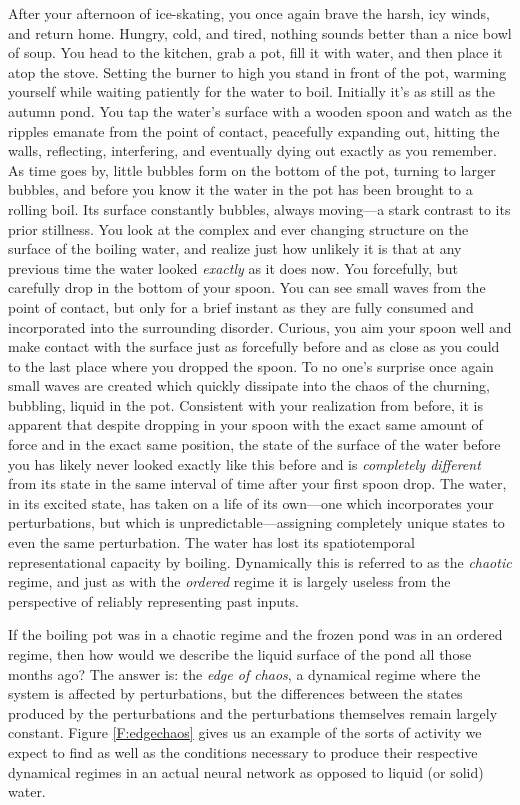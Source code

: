 After your afternoon of ice-skating, you once again brave the harsh, icy winds, and return home. Hungry, cold, and tired, nothing sounds better than a nice bowl of soup. You head to the kitchen, grab a pot, fill it with water, and then place it atop the stove. Setting the burner to high you stand in front of the pot, warming yourself while waiting patiently for the water to boil. Initially it's as still as the autumn pond. You tap the water's surface with a wooden spoon and watch as the ripples emanate from the point of contact, peacefully expanding out, hitting the walls, reflecting, interfering, and eventually dying out exactly as you remember. As time goes by, little bubbles form on the bottom of the pot, turning to larger bubbles, and before you know it the water in the pot has been brought to a rolling boil. Its surface constantly bubbles, always moving---a stark contrast to its prior stillness. You look at the complex and ever changing structure on the surface of the boiling water, and realize just how unlikely it is that at any previous time the water looked \emph{exactly} as it does now. You forcefully, but carefully drop in the bottom of your spoon. You can see small waves from the point of contact, but only for a brief instant as they are fully consumed and incorporated into the surrounding disorder. Curious, you aim your spoon well and make contact with the surface just as forcefully before and as close as you could to the last place where you dropped the spoon. To no one's surprise once again small waves are created which quickly dissipate into the chaos of the churning, bubbling, liquid in the pot. Consistent with your realization from before, it is apparent that despite dropping in your spoon with the exact same amount of force and in the exact same position, the state of the surface of the water before you has likely never looked exactly like this before and is \emph{completely different} from its state in the same interval of time after your first spoon drop. The water, in its excited state, has taken on a life of its own---one which incorporates your perturbations, but which is unpredictable---assigning completely unique states to even the same perturbation. The water has lost its spatiotemporal representational capacity by boiling. Dynamically this is referred to as the \emph{chaotic} regime, and just as with the \emph{ordered} regime it is largely useless from the perspective of reliably representing past inputs.

If the boiling pot was in a chaotic regime and the frozen pond was in an ordered regime, then how would we describe the liquid surface of the pond all those months ago? The answer is: the \emph{edge of chaos}, a dynamical regime where the system is affected by perturbations, but the differences between the states produced by the perturbations and the perturbations themselves remain largely constant. Figure \ref{F:edgechaos} gives us an example of the sorts of activity we expect to find as well as the conditions necessary to produce their respective dynamical regimes in an actual neural network as opposed to liquid (or solid) water.

